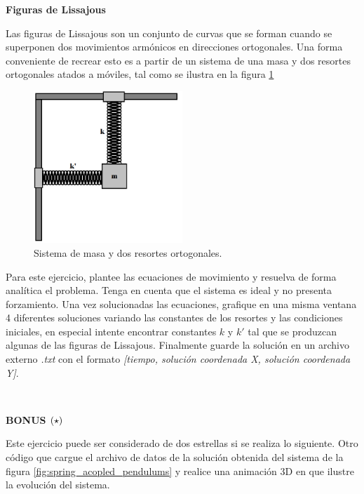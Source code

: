 \textbf{Figuras de Lissajous}

Las figuras de Lissajous son un conjunto de curvas que se forman cuando se
superponen dos movimientos armónicos en direcciones ortogonales. Una forma
conveniente de recrear esto es a partir de un sistema de una masa y dos 
resortes ortogonales atados a móviles, tal como se ilustra en la figura
\ref{fig:two_springs}


\begin{figure}[htbp]
	\centering
	\includegraphics[width=0.50\textwidth]
	{./pictures/Lissajous.png}

	\caption{\small{Sistema de masa y dos resortes ortogonales.}}
	
	\label{fig:two_springs}
\end{figure}


Para este ejercicio, plantee las ecuaciones de movimiento y resuelva de 
forma analítica el problema. Tenga en cuenta que el sistema es ideal y no
presenta forzamiento. Una vez solucionadas las ecuaciones, grafique en una 
misma ventana 4 diferentes soluciones variando las constantes de los 
resortes y las condiciones iniciales, en especial intente encontrar 
constantes $k$ y $k'$ tal que se produzcan algunas de las figuras de 
Lissajous. Finalmente guarde la solución en un archivo externo \textit{.txt} 
con el formato \textit{[tiempo, solución coordenada X, solución coordenada Y]}.


\

\textbf{BONUS \large{$\left( \star \right)$}}

Este ejercicio puede ser considerado de dos estrellas si se realiza lo 
siguiente. Otro código que cargue el archivo de datos de la solución 
obtenida del sistema de la figura \ref{fig:spring_acopled_pendulums} y 
realice una animación 3D en \mayavi que ilustre la evolución del sistema.



